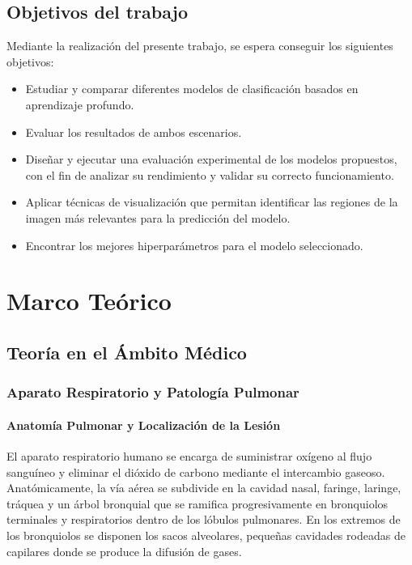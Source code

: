 \documentclass[11pt, a4paper]{article}
\numberwithin{equation}{section}
\begin{document}
\subsection{Objetivos del trabajo}
Mediante la realización del presente trabajo, se espera conseguir los siguientes objetivos:

\begin{itemize}
    \item Estudiar y comparar diferentes modelos de clasificación basados en aprendizaje profundo.
    \item Evaluar los resultados de ambos escenarios.
    \item Diseñar y ejecutar una evaluación experimental de los modelos propuestos, con el fin de analizar su rendimiento y validar su correcto funcionamiento.
    \item Aplicar técnicas de visualización que permitan identificar las regiones de la imagen más relevantes para la predicción del modelo.
    \item Encontrar los mejores hiperparámetros para el modelo seleccionado.
\end{itemize}
\newpage
\section{Marco Teórico}

\subsection{Teoría en el Ámbito Médico}
\label{sec:teoria_ambito_medico}

\subsubsection{Aparato Respiratorio y Patología Pulmonar}

\paragraph{Anatomía Pulmonar y Localización de la Lesión}

El aparato respiratorio humano se encarga de suministrar oxígeno al flujo sanguíneo y eliminar el dióxido de carbono mediante el intercambio gaseoso. Anatómicamente, la vía aérea se subdivide en la cavidad nasal, faringe, laringe, tráquea y un árbol bronquial que se ramifica progresivamente en bronquiolos terminales y respiratorios dentro de los lóbulos pulmonares. En los extremos de los bronquiolos se disponen los sacos alveolares, pequeñas cavidades rodeadas de capilares donde se produce la difusión de gases.
\end{document}
